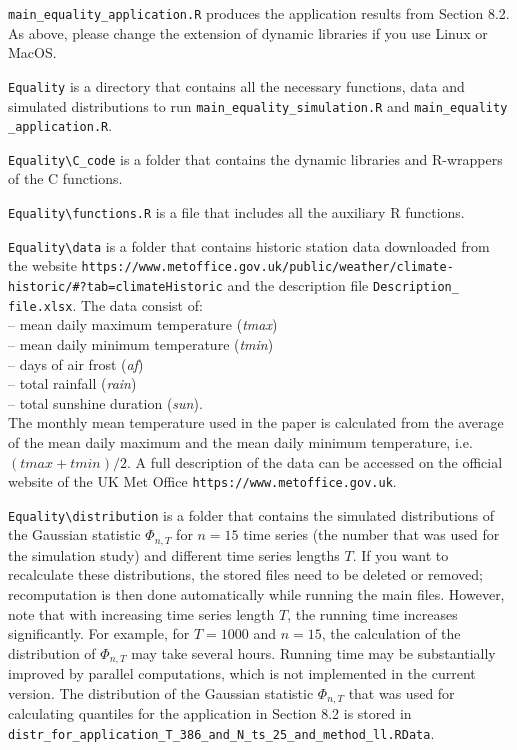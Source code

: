 \documentclass[a4paper,12pt]{article}
\begin{document}
\verb|main_equality_application.R| \hspace{1pt} produces the application results from Section 8.2. As above, please change the extension of dynamic libraries if you use Linux or MacOS.

\verb|Equality| \hspace{1pt} is a directory that contains all the necessary functions, data and simulated distributions to run \verb|main_equality_simulation.R| and \verb|main_equality| \linebreak \verb|_application.R|.

\verb|Equality\C_code| \hspace{1pt} is a folder that contains the dynamic libraries and R-wrappers of the C functions.

\verb|Equality\functions.R| \hspace{1pt} is a file that includes all the auxiliary R functions.

\verb|Equality\data| \hspace{1pt} is a folder that contains historic station data downloaded from the website
{\verb|https://www.metoffice.gov.uk/public/weather/climate-| \verb|historic/#?tab=climateHistoric|
and the description file \verb|Description_| \verb|file.xlsx|. The data consist of: \\[0.2cm]
-- mean daily maximum temperature (\textit{tmax}) \\
-- mean daily minimum temperature (\textit{tmin}) \\
-- days of air frost (\textit{af}) \\
-- total rainfall (\textit{rain}) \\
-- total sunshine duration (\textit{sun}). \\[0.2cm]
The monthly mean temperature used in the paper is calculated from the average of the mean daily maximum and the mean daily minimum temperature, i.e.\ $(tmax+tmin)/2$. A full description of the data can be accessed on the official website of the UK Met Office \verb|https://www.metoffice.gov.uk|.}

\verb|Equality\distribution| \hspace{1pt} is a folder that contains the simulated distributions of the Gaussian statistic $\Phi_{n, T}$ for $n= 15$ time series (the number that was used for the simulation study) and different time series lengths $T$. If you want to recalculate these distributions, the stored files need to be deleted or removed; recomputation is then done automatically while running the main files. However, note that with increasing time series length $T$, the running time increases significantly. For example, for $T = 1000$ and $n = 15$, the calculation of the distribution of $\Phi_{n, T}$ may take several hours. Running time may be substantially improved by parallel computations, which is not implemented in the current version. The distribution of the Gaussian statistic $\Phi_{n, T}$ that was used for calculating quantiles for the application in Section 8.2 is stored in \verb|distr_for_application_T_386_and_N_ts_25_and_method_ll.RData|.
\end{document}

